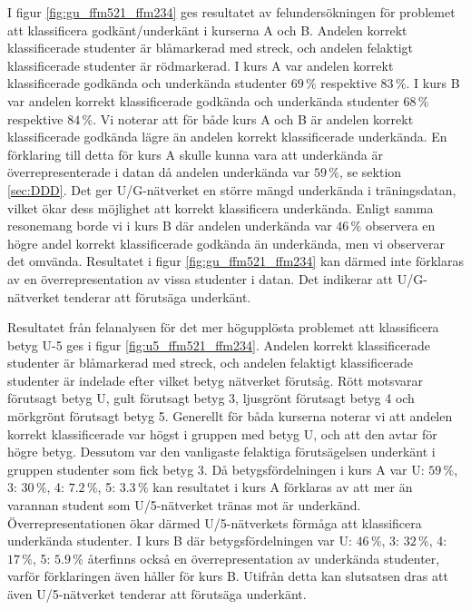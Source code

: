 I figur \ref{fig:gu_ffm521_ffm234} ges resultatet av felundersökningen för problemet att klassificera godkänt/underkänt i kurserna A och B. Andelen korrekt klassificerade studenter är blåmarkerad med streck, och andelen felaktigt klassificerade studenter är rödmarkerad. I kurs A var andelen korrekt klassificerade godkända och underkända studenter $69 \,\%$ respektive $83\, \%$. I kurs B var andelen korrekt klassificerade godkända och underkända studenter $68 \, \%$ respektive $84 \, \%$. Vi noterar att för både kurs A och B är andelen korrekt klassificerade godkända lägre än andelen korrekt klassificerade underkända. En förklaring till detta för kurs A skulle kunna vara att underkända är överrepresenterade i datan då andelen underkända var $59 \, \%$, se sektion \ref{sec:DDD}. Det ger U/G-nätverket en större mängd underkända i träningsdatan, vilket ökar dess möjlighet att korrekt klassificera underkända. Enligt samma resonemang borde vi i kurs B där andelen underkända var $46 \, \%$ observera en högre andel korrekt klassificerade godkända än underkända, men vi observerar det omvända. Resultatet i figur \ref{fig:gu_ffm521_ffm234} kan därmed inte förklaras av en överrepresentation av vissa studenter i datan. Det indikerar att U/G-nätverket tenderar att förutsäga underkänt. 

Resultatet från felanalysen för det mer högupplösta problemet att klassificera betyg U-5 ges i figur \ref{fig:u5_ffm521_ffm234}. Andelen korrekt klassificerade studenter är blåmarkerad med streck, och andelen felaktigt klassificerade studenter är indelade efter vilket betyg nätverket förutsåg. Rött motsvarar förutsagt betyg U, gult förutsagt betyg 3, ljusgrönt förutsagt betyg 4 och mörkgrönt förutsagt betyg 5. Generellt för båda kurserna noterar vi att andelen korrekt klassificerade var högst i gruppen med betyg U, och att den avtar för högre betyg. Dessutom var den vanligaste felaktiga förutsägelsen underkänt i gruppen studenter som fick betyg 3. Då betygsfördelningen i kurs A var U: $59 \, \%$, 3: $30 \, \%$, 4: $7.2 \, \%$, 5: $3.3 \, \%$ kan resultatet i kurs A förklaras av att mer än varannan student som U/5-nätverket tränas mot är underkänd. Överrepresentationen ökar därmed U/5-nätverkets förmåga att klassificera underkända studenter. I kurs B där betygsfördelningen var U: $46 \, \%$, 3: $32 \, \%$, 4: $17 \, \%$, 5: $5.9 \, \%$ återfinns också en överrepresentation av underkända studenter, varför förklaringen även håller för kurs B. Utifrån detta kan slutsatsen dras att även U/5-nätverket tenderar att förutsäga underkänt. 

